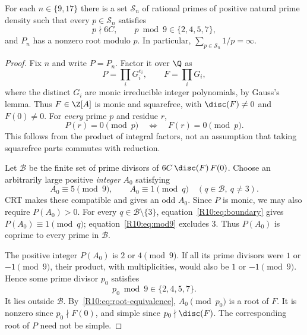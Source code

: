 \documentclass[11pt,a4paper]{article}
\theoremstyle{definition}\newtheorem{definition}[theorem]{Definition}
\theoremstyle{remark}\newtheorem{remark}[theorem]{Remark}
\begin{document}
\begin{proposition}\label{R10:prop:witnessprimes}
For each $n\in\{9,17\}$ there is a set $\mathcal S_n$ of rational primes
of positive natural prime density such that every $p\in\mathcal S_n$
satisfies
\[
             p\nmid6C,\qquad p\bmod9\in\{2,4,5,7\},
\]
and $P_n$ has a nonzero root modulo $p$.
In particular, $\sum_{p\in\mathcal S_n}1/p=\infty$.
\end{proposition}
\begin{proof}
Fix $n$ and write $P=P_n$.
Factor it over $\Q$ as
\[
                    P=\prod_i G_i^{e_i},\qquad F=\prod_i G_i,
\]
where the distinct $G_i$ are monic irreducible integer polynomials,
by Gauss's lemma. Thus $F\in\Z[A]$ is monic and squarefree, with
$\disc(F)\ne0$ and $F(0)\ne0$.
For \emph{every} prime $p$ and residue $r$,
\begin{equation}\label{R10:eq:root-equivalence}
                         P(r)=0\pmod p\quad\Longleftrightarrow\quad
                         F(r)=0\pmod p.
\end{equation}
This follows from the product of integral factors, not an assumption
that taking squarefree parts commutes with reduction.

Let $\mathcal B$ be the finite set of prime divisors of
$6C\,\disc(F)\,F(0)$.
Choose an arbitrarily large positive \emph{integer} $A_0$ satisfying
\begin{equation}\label{R10:eq:anchor}
 A_0\equiv5\pmod9,\qquad
 A_0\equiv1\pmod q\quad(q\in\mathcal B,\ q\ne3).
\end{equation}
CRT makes these compatible and gives an odd $A_0$.
Since $P$ is monic, we may also require $P(A_0)>0$.
For every $q\in\mathcal B\setminus\{3\}$,
equation~\eqref{R10:eq:boundary} gives $P(A_0)\equiv1\pmod q$;
equation~\eqref{R10:eq:mod9} excludes $3$.
Thus $P(A_0)$ is coprime to every prime in $\mathcal B$.

The positive integer $P(A_0)$ is $2$ or $4\pmod9$.
If all its prime divisors were $1$ or $-1\pmod9$, their product,
with multiplicities, would also be $1$ or $-1\pmod9$.
Hence some prime divisor $p_0$ satisfies
\begin{equation}\label{R10:eq:p0}
                            p_0\bmod9\in\{2,4,5,7\}.
\end{equation}
It lies outside $\mathcal B$.
By~\eqref{R10:eq:root-equivalence}, $A_0\pmod{p_0}$ is a root of $F$.
It is nonzero since $p_0\nmid F(0)$, and simple since
$p_0\nmid\disc(F)$. The corresponding root of $P$ need not be simple.


\end{proof}
\end{document}
